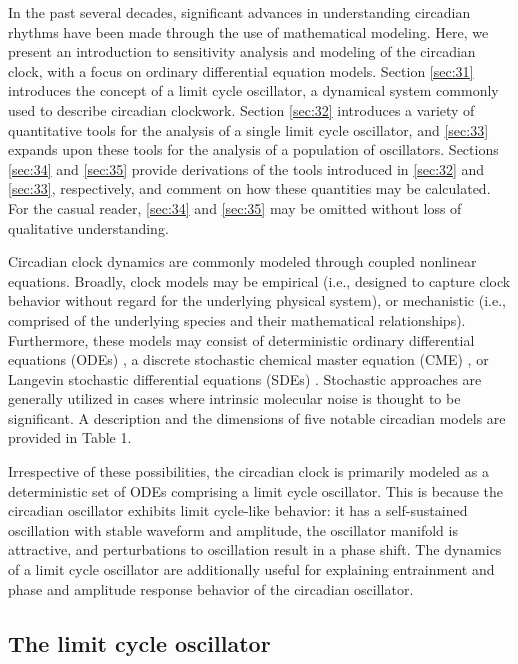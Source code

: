 In the past several decades, significant advances in understanding circadian rhythms have been made through the use of mathematical modeling.
Here, we present an introduction to sensitivity analysis and modeling of the circadian clock, with a focus on ordinary differential equation models.
Section \ref{sec:31} introduces the concept of a limit cycle oscillator, a dynamical system commonly used to describe circadian clockwork.
Section \ref{sec:32} introduces a variety of quantitative tools for the analysis of a single limit cycle oscillator, and \ref{sec:33} expands upon these tools for the analysis of a population of oscillators.
Sections \ref{sec:34} and \ref{sec:35} provide derivations of the tools introduced in \ref{sec:32} and \ref{sec:33}, respectively, and comment on how these quantities may be calculated.
For the casual reader, \ref{sec:34} and \ref{sec:35} may be omitted without loss of qualitative understanding.


Circadian clock dynamics are commonly modeled through coupled nonlinear equations.
Broadly, clock models may be empirical (i.e., designed to capture clock behavior without regard for the underlying physical system), or mechanistic (i.e., comprised of the underlying species and their mathematical relationships).
Furthermore, these models may consist of deterministic ordinary differential equations (ODEs) \cite{Kronauer1999, Jewett1999, Leloup2003a, To2007, Mirsky2009b, Kim2012, Hirota2012a}, a discrete stochastic chemical master equation (CME) \cite{Forger2005, Gonze2006, Ko2010, Abel2015a}, or Langevin stochastic differential equations (SDEs) \cite{Westermark2009, Koeppl2011}.
Stochastic approaches are generally utilized in cases where intrinsic molecular noise is thought to be significant.
A description and the dimensions of five notable circadian models are provided in Table 1.

Irrespective of these possibilities, the circadian clock is primarily modeled as a deterministic set of ODEs comprising a limit cycle oscillator.
This is because the circadian oscillator exhibits limit cycle-like behavior: it has a self-sustained oscillation with stable waveform and amplitude, the oscillator manifold is attractive, and perturbations to oscillation result in a phase shift.
The dynamics of a limit cycle oscillator are additionally useful for explaining entrainment and phase and amplitude response behavior of the circadian oscillator.


\subsection*{The limit cycle oscillator\label{sec:31}}

